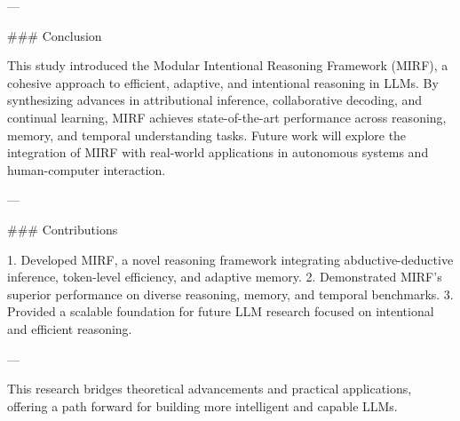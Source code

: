 ---

### Conclusion

This study introduced the Modular Intentional Reasoning Framework (MIRF), a cohesive approach to efficient, adaptive, and intentional reasoning in LLMs. By synthesizing advances in attributional inference, collaborative decoding, and continual learning, MIRF achieves state-of-the-art performance across reasoning, memory, and temporal understanding tasks. Future work will explore the integration of MIRF with real-world applications in autonomous systems and human-computer interaction.

---

### Contributions

1. Developed MIRF, a novel reasoning framework integrating abductive-deductive inference, token-level efficiency, and adaptive memory.
2. Demonstrated MIRF's superior performance on diverse reasoning, memory, and temporal benchmarks.
3. Provided a scalable foundation for future LLM research focused on intentional and efficient reasoning.

--- 

This research bridges theoretical advancements and practical applications, offering a path forward for building more intelligent and capable LLMs.